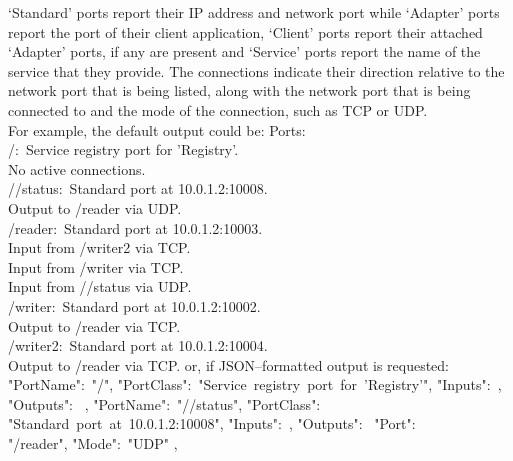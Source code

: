 `Standard' ports report their IP address and network port while `Adapter' ports report
the \mplusm{} port of their client application, `Client' ports report their attached
`Adapter' ports, if any are present and `Service' ports report the name of the \mplusm{}
service that they provide.
The connections indicate their direction relative to the \yarp{} network port that is
being listed, along with the \yarp{} network port that is being connected to and the mode
of the connection, such as TCP or UDP.\\

For example, the default output could be:
\outputBegin{}
Ports:\\
\settowidth{\utilLen}{Por}%
/\dollarService:\ Service registry port for 'Registry'.\\
\hspace*{\utilLen}No active connections.\\
/\dollarService/status:\ Standard port at 10.0.1.2:10008.\\
\hspace*{\utilLen}Output to /reader via UDP.\\
/reader:\ Standard port at 10.0.1.2:10003.\\
\hspace*{\utilLen}Input from /writer2 via TCP.\\
\hspace*{\utilLen}Input from /writer via TCP.\\
\hspace*{\utilLen}Input from /\dollarService/status via UDP.\\
/writer:\ Standard port at 10.0.1.2:10002.\\
\hspace*{\utilLen}Output to /reader via TCP.\\
/writer2:\ Standard port at 10.0.1.2:10004.\\
\hspace*{\utilLen}Output to /reader via TCP.
\outputEnd{}
or, if JSON--formatted output is requested:
\outputBegin{}
\openSq{} \textbraceleft{} "PortName":\ "/\dollarService", "PortClass":\
"Service~registry~port~for~'Registry'", "Inputs":\ \sqPair, "Outputs":\
\sqPair{} \textbraceright{}, \textbraceleft{} "PortName":\ "/\dollarService/status",
"PortClass":\ \\
"Standard~port~at~10.0.1.2:10008", "Inputs":\ \sqPair, "Outputs":\ \openSq{}
\textbraceleft{} "Port":\ \\
"/reader", "Mode":\ "UDP" \textbraceright{} \closeSq{} \textbraceright{},
